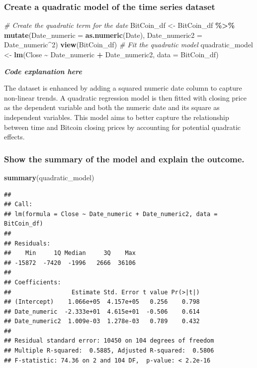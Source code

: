 \documentclass[
]{book}
\newenvironment{Shaded}{\begin{snugshade}}{\end{snugshade}}
\newcommand{\AttributeTok}[1]{\textcolor[rgb]{0.13,0.29,0.53}{#1}}
\newcommand{\CommentTok}[1]{\textcolor[rgb]{0.56,0.35,0.01}{\textit{#1}}}
\newcommand{\DecValTok}[1]{\textcolor[rgb]{0.00,0.00,0.81}{#1}}
\newcommand{\FunctionTok}[1]{\textcolor[rgb]{0.13,0.29,0.53}{\textbf{#1}}}
\newcommand{\NormalTok}[1]{#1}
\newcommand{\OtherTok}[1]{\textcolor[rgb]{0.56,0.35,0.01}{#1}}
\newcommand{\SpecialCharTok}[1]{\textcolor[rgb]{0.81,0.36,0.00}{\textbf{#1}}}
\begin{document}
\subsubsection{Create a quadratic model of the time series dataset}\label{create-a-quadratic-model-of-the-time-series-dataset}

\begin{Shaded}
\begin{Highlighting}[]
\CommentTok{\# Create the quadratic term for the date}
\NormalTok{BitCoin\_df }\OtherTok{\textless{}{-}}\NormalTok{ BitCoin\_df }\SpecialCharTok{\%\textgreater{}\%}
  \FunctionTok{mutate}\NormalTok{(}\AttributeTok{Date\_numeric =} \FunctionTok{as.numeric}\NormalTok{(Date),}
         \AttributeTok{Date\_numeric2 =}\NormalTok{ Date\_numeric}\SpecialCharTok{\^{}}\DecValTok{2}\NormalTok{)}
\FunctionTok{view}\NormalTok{(BitCoin\_df)}
\CommentTok{\# Fit the quadratic model}
\NormalTok{quadratic\_model }\OtherTok{\textless{}{-}} \FunctionTok{lm}\NormalTok{(Close }\SpecialCharTok{\textasciitilde{}}\NormalTok{ Date\_numeric }\SpecialCharTok{+}\NormalTok{ Date\_numeric2, }\AttributeTok{data =}\NormalTok{ BitCoin\_df)}
\end{Highlighting}
\end{Shaded}

\emph{\textbf{Code explanation here}}

The dataset is enhanced by adding a squared numeric date column to capture non-linear trends. A quadratic regression model is then fitted with closing price as the dependent variable and both the numeric date and its square as independent variables. This model aims to better capture the relationship between time and Bitcoin closing prices by accounting for potential quadratic effects.

\subsubsection{Show the summary of the model and explain the outcome.}\label{show-the-summary-of-the-model-and-explain-the-outcome.-1}

\begin{Shaded}
\begin{Highlighting}[]
\FunctionTok{summary}\NormalTok{(quadratic\_model)}
\end{Highlighting}
\end{Shaded}

\begin{verbatim}
## 
## Call:
## lm(formula = Close ~ Date_numeric + Date_numeric2, data = BitCoin_df)
## 
## Residuals:
##    Min     1Q Median     3Q    Max 
## -15872  -7420  -1996   2666  36106 
## 
## Coefficients:
##                 Estimate Std. Error t value Pr(>|t|)
## (Intercept)    1.066e+05  4.157e+05   0.256    0.798
## Date_numeric  -2.333e+01  4.615e+01  -0.506    0.614
## Date_numeric2  1.009e-03  1.278e-03   0.789    0.432
## 
## Residual standard error: 10450 on 104 degrees of freedom
## Multiple R-squared:  0.5885, Adjusted R-squared:  0.5806 
## F-statistic: 74.36 on 2 and 104 DF,  p-value: < 2.2e-16
\end{verbatim}
\end{document}

